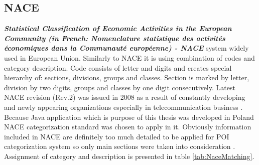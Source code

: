 \subsection{NACE}
\label{NACE}
\textit{\textbf{Statistical Classification of Economic Activities in the European Community (in French: Nomenclature statistique des activités économiques dans la Communauté européenne) - NACE}} system widely used in European Union. Similarly to NACE it is using combination of codes and category description. Code consists of letter and digits and creates special hierarchy of: sections, divisions, groups and classes. Section is marked by letter, division by two digits, groups and classes by one digit consecutively. Latest NACE revision (Rev.2) was issued in 2008 as a result of constantly developing and  newly appearing organizations especially in telecommunication business \cite{17} \cite{18}. Because Java application which is purpose of this thesis was developed in Poland NACE categorization standard was chosen to apply in it. Obviously information included in NACE are definitely too much detailed to be applied for POI categorization system so only main sections were taken into consideration \cite{31}. Assignment of category and description is presented in table \ref{tab:NaceMatching}.
